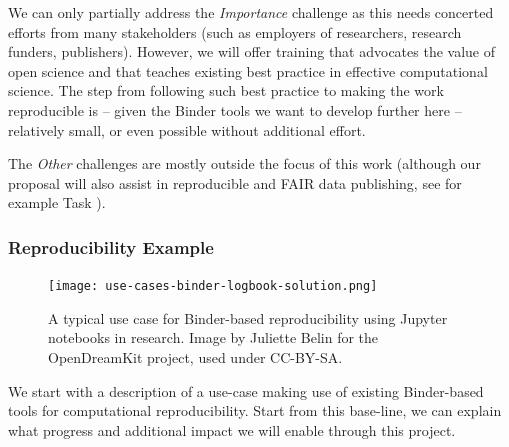 We can only partially address the \emph{Importance} challenge as this needs
concerted efforts from many stakeholders (such as employers of researchers,
research funders, publishers). However, we will offer training that advocates
the value of open science and that teaches existing best practice in
effective computational science. The step from following such best practice to
making the work reproducible is -- given the Binder tools we want to develop
further here -- relatively small, or even possible without additional effort.

The \emph{Other} challenges are mostly outside the focus of this work
(although our proposal will also assist in reproducible and FAIR data
publishing, see for example Task ).



\subsubsection{Reproducibility Example}
\label{sec:reproducibility-example}

\begin{figure}[htb]\centering
  \texttt{[image: use-cases-binder-logbook-solution.png]}
  \caption{A typical use case for Binder-based reproducibility using Jupyter notebooks in research.
            Image by Juliette Belin for the OpenDreamKit project, used under
            CC-BY-SA.}\label{fig:use-cases-binder}
\end{figure}

We start with a description of a use-case making use of existing Binder-based
tools for computational reproducibility. Start from this base-line, we can
explain what progress and additional impact we will enable through this project.

